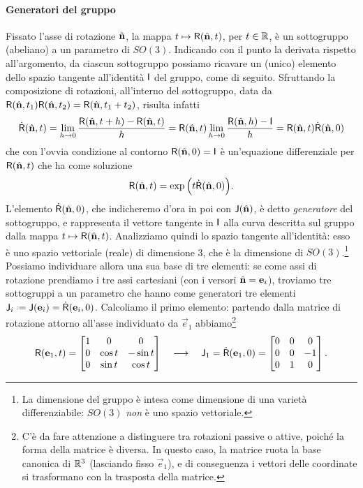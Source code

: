 \paragraph{Generatori del gruppo}
Fissato l'asse di rotazione $\hat{\mathbf{n}}$, la mappa $t\mapsto\mathsf{R}(\hat{\mathbf{n}},t)$, per $t\in\mathbb{R}$, è un sottogruppo (abeliano) a un parametro di $SO(3)$.
Indicando con il punto la derivata rispetto all'argomento, da ciascun sottogruppo possiamo ricavare un (unico) elemento dello spazio tangente all'identità $\mathsf{I}$ del gruppo, come di seguito.
Sfruttando la composizione di rotazioni, all'interno del sottogruppo, data da $\mathsf{R}(\hat{\mathbf{n}},t_1)\mathsf{R}(\hat{\mathbf{n}},t_2)=\mathsf{R}(\hat{\mathbf{n}},t_1+t_2)$, risulta infatti
\begin{equation}
	\dot{\mathsf{R}}(\hat{\mathbf{n}},t)=\lim_{h\to 0}\frac{\mathsf{R}(\hat{\mathbf{n}},t+h)-\mathsf{R}(\hat{\mathbf{n}},t)}{h}=\mathsf{R}(\hat{\mathbf{n}},t)\lim_{h\to 0}\frac{\mathsf{R}(\hat{\mathbf{n}},h)-\mathsf{I}}{h}=\mathsf{R}(\hat{\mathbf{n}},t)\dot{\mathsf{R}}(\hat{\mathbf{n}},0)
	\label{eq:derivata-rotazione}
\end{equation}
che con l'ovvia condizione al contorno $\mathsf{R}(\hat{\mathbf{n}},0)=\mathsf{I}$ è un'equazione differenziale per $\mathsf{R}(\hat{\mathbf{n}},t)$ che ha come soluzione
\begin{equation}
	\mathsf{R}(\hat{\mathbf{n}},t)=\exp\Big(t\dot{\mathsf{R}}(\hat{\mathbf{n}},0)\Big).
	\label{eq:rotazione-esponenziale}
\end{equation}
L'elemento $\dot{\mathsf{R}}(\hat{\mathbf{n}},0)$, che indicheremo d'ora in poi con $\mathsf{J}(\hat{\mathbf{n}})$, è detto \emph{generatore} del sottogruppo, e rappresenta il vettore tangente in $\mathsf{I}$ alla curva descritta sul gruppo dalla mappa $t\mapsto\mathsf{R}(\hat{\mathbf{n}},t)$.
Analizziamo quindi lo spazio tangente all'identità: esso è uno spazio vettoriale (reale) di dimensione 3, che è la dimensione di $SO(3)$.\footnote{La dimensione del gruppo è intesa come dimensione di una varietà differenziabile: $SO(3)$ \emph{non} è uno spazio vettoriale.}
Possiamo individuare allora una sua base di tre elementi: se come assi di rotazione prendiamo i tre assi cartesiani (con i versori $\hat{\mathbf{n}}=\mathbf{e}_i$), troviamo tre sottogruppi a un parametro che hanno come generatori tre elementi $\Ang_i\defeq\Ang(\vec e_i)=\dot{\Rot}(\vec e_i,0)$.
Calcoliamo il primo elemento: partendo dalla matrice di rotazione attorno all'asse individuato da $\vec e_1$ abbiamo\footnote{
	C'è da fare attenzione a distinguere tra rotazioni passive o attive, poich\'e la forma della matrice è diversa.
	In questo caso, la matrice ruota la base canonica di $\mathbb{R}^3$ (lasciando fisso $\vec e_1$), e di conseguenza i vettori delle coordinate si trasformano con la trasposta della matrice.}
\begin{equation}
	\mathsf{R}(\mathbf{e}_1,t)=
	\begin{bmatrix}
		1	&0		&0		\\
		0	&\cos t	&-\sin t\\
		0	&\sin t	&\cos t
	\end{bmatrix}
	\quad\longrightarrow\quad
	\mathsf{J}_1=\dot{\mathsf{R}}(\mathbf{e}_1,0)=
	\begin{bmatrix}
		0	&0	&0	\\
		0	&0	&-1	\\
		0	&1	&0
	\end{bmatrix}.
\end{equation}
